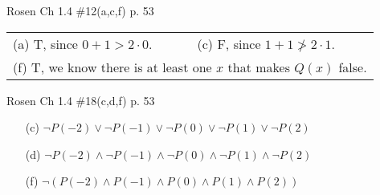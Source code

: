 \documentclass[12pt,addpoints]{exam}
\begin{document}
\begin{questions}
\question Rosen Ch 1.4 \#12(a,c,f) p. 53
    \ifprintanswers
        \vspace{-12pt}
    \fi
\begin{solution}
    \begin{tabular}{ll}
    	(a) T, since $0 + 1 > 2\cdot 0$. 
    	 & (c) F, since $1 + 1 \ngtr 2\cdot 1$. \\
    	\multicolumn{2}{l}{(f) T, we know there is at least one $x$ that makes $Q(x)$ false.}
    \end{tabular}
\end{solution}


\question Rosen Ch 1.4 \#18(c,d,f) p. 53
    \ifprintanswers
        \vspace{-12pt}
    \fi
\begin{solution}
    \begin{itemize}[itemsep=0pt,parsep=0pt,topsep=0pt,partopsep=0pt]
        \item[(c)] $\neg P(-2) \vee \neg P(-1) \vee \neg P(0) \vee \neg P(1) \vee \neg P(2)$
        \item[(d)] $\neg P(-2) \wedge \neg P(-1) \wedge \neg P(0) \wedge \neg P(1) \wedge \neg P(2)$
        \item[(f)] $\neg (P(-2) \wedge P(-1) \wedge P(0) \wedge P(1) \wedge P(2))$
    \end{itemize}
\end{solution}



\end{questions}
\end{document}

